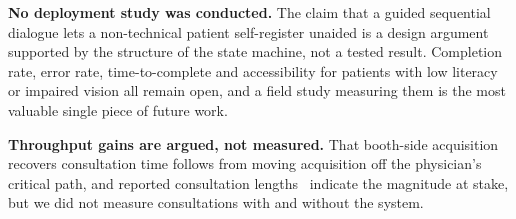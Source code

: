 \textbf{No deployment study was conducted.} The claim that a guided sequential dialogue lets a
non-technical patient self-register unaided is a design argument supported by the structure of the
state machine, not a tested result. Completion rate, error rate, time-to-complete and accessibility
for patients with low literacy or impaired vision all remain open, and a field study measuring them
is the most valuable single piece of future work.

\textbf{Throughput gains are argued, not measured.} That booth-side acquisition recovers
consultation time follows from moving acquisition off the physician's critical path, and reported
consultation lengths~\cite{das2021appointment} indicate the magnitude at stake, but we did not
measure consultations with and without the system.

